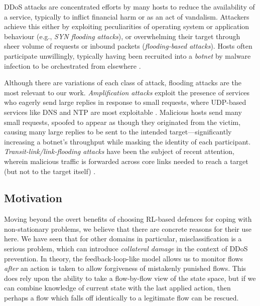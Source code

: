 \documentclass[conference, a4paper, 10pt, times]{IEEEtran}
\begin{document}

DDoS attacks are concentrated efforts by many hosts to reduce the availability of a service, typically to inflict financial harm or as an act of vandalism.
Attackers achieve this either by exploiting peculiarities of operating system or application behaviour (e.g., \emph{SYN flooding attacks}), or overwhelming their target through sheer volume of requests or inbound packets (\emph{flooding-based attacks}).
Hosts often participate unwillingly, typically having been recruited into a \emph{botnet} by malware infection to be orchestrated from elsewhere \cite{DBLP:conf/uss/AntonakakisABBB17}.

Although there are variations of each class of attack, flooding attacks are the most relevant to our work.
\emph{Amplification attacks} exploit the presence of services who eagerly send large replies in response to small requests, where UDP-based services like DNS and NTP are most exploitable \cite{DBLP:conf/ndss/Rossow14, DBLP:conf/uss/KuhrerHRH14}.
Malicious hosts send many small requests, spoofed to appear as though they originated from the victim, causing many large replies to be sent to the intended target---significantly increasing a botnet's throughput while masking the identity of each participant.
\emph{Transit-link/link-flooding attacks} have been the subject of recent attention, wherein malicious traffic is forwarded across core links needed to reach a target (but not to the target itself) \cite{DBLP:conf/sp/KangLG13, DBLP:conf/esorics/StuderP09}.

\subsection{Motivation}\label{sec:motivation}
Moving beyond the overt benefits of choosing RL-based defences for coping with non-stationary problems, we believe that there are concrete reasons for their use here.
We have seen that for other domains in particular, misclassification is a serious problem, which can introduce \emph{collateral damage} in the context of DDoS prevention.
In theory, the feedback-loop-like model allows us to monitor flows \emph{after} an action is taken to allow forgiveness of mistakenly punished flows.
This does rely upon the ability to take a flow-by-flow view of the state space, but if we can combine knowledge of current state with the last applied action, then perhaps a flow which falls off identically to a legitimate flow can be rescued.
\end{document}
